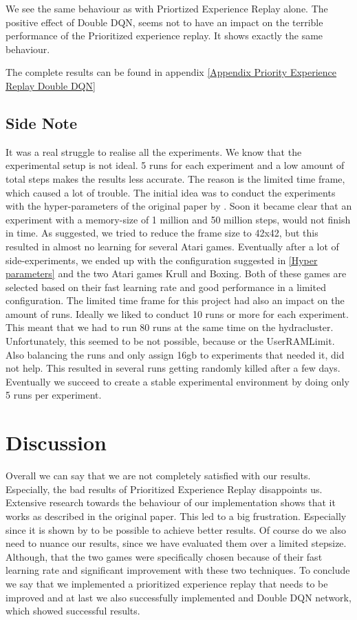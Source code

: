\documentclass{sig-alternate}
\begin{document}
We see the same behaviour as with Priortized Experience Replay alone. The positive effect of Double DQN, seems not to have an impact on the terrible performance of the Prioritized experience replay. It shows exactly the same behaviour.

The complete results can be found in appendix \ref{Appendix Priority Experience Replay Double DQN}

\subsection{Side Note}
It was a real struggle to realise all the experiments.
We know that the experimental setup is not ideal. 5 runs for each experiment and a low amount of total steps makes the results less accurate. The reason is the limited time frame, which caused a lot of trouble. The initial idea was to conduct the experiments with the hyper-parameters of the original paper by \cite{mnih2015human}. Soon it became clear that an experiment with a memory-size of 1 million and 50 million steps, would not finish in time. As suggested, we tried to reduce the frame size to 42x42, but this resulted in almost no learning for several Atari games. Eventually after a lot of side-experiments, we ended up with the configuration suggested in \ref{Hyper parameters} and the two Atari games Krull and Boxing. Both of these games are selected based on their fast learning rate and good performance in a limited configuration. The limited time frame for this project had also an impact on the amount of runs. Ideally we liked to conduct 10 runs or more for each experiment. This meant that we had to run 80 runs at the same time on the hydracluster. Unfortunately, this seemed to be not possible, because or the UserRAMLimit. Also balancing the runs and only assign 16gb to experiments that needed it, did not help. This resulted in several runs getting randomly killed after a few days. Eventually we succeed to create a stable experimental environment by doing only 5 runs per experiment. 

\section{Discussion}

Overall we can say that we are not completely satisfied with our results. Especially, the bad results of Prioritized Experience Replay disappoints us. Extensive research towards the behaviour of our implementation shows that it works as described in the original paper. This led to a big frustration. Especially since it is shown by \cite{schaul2015prioritized} to be possible to achieve better results. Of course do we also need to nuance our results, since we have evaluated them over a limited stepsize. Although, that the two games were specifically chosen because of their fast learning rate and significant improvement with these two techniques. To conclude we say that we implemented a prioritized experience replay that needs to be improved and at last we also successfully implemented and Double DQN network, which showed successful results. 
\end{document}
